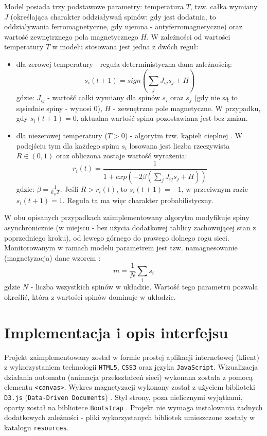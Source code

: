 \documentclass[11pt] {article}
\begin{document}
\vspace{1.0em}
Model posiada trzy podstawowe parametry: temperatura $T$, tzw. całka wymiany $J$ (określająca charakter oddziaływań spinów: gdy jest dodatnia, to oddziaływania ferromagnetyczne, gdy ujemna - antyferromagnetyczne) oraz wartość zewnętrznego pola magnetycznego $H$. W zależności od wartości temperatury $T$ w modelu stosowana jest jedna z dwóch reguł:
\begin{itemize}
\item dla zerowej temperatury - reguła deterministyczna \cite{malarz, kulakowski} dana zależnością: 
\begin{equation}
s_i(t + 1) = sign \left( \sum_jJ_{ij}s_j + H \right)
\end{equation}
gdzie: $J_{ij}$ - wartość całki wymiany dla spinów $s_i$ oraz $s_j$ (gdy nie są to sąsiednie spiny - wynosi 0), $H$ - zewnętrzne pole magnetyczne. W przypadku, gdy $s_i(t + 1) = 0$, aktualna wartość spinu pozostawiana jest bez zmian.

\item dla niezerowej temperatury ($T > 0$) - algorytm tzw. kąpieli cieplnej \cite{baldyga}. W podejściu tym dla każdego spinu $s_i$ losowana jest liczba rzeczywista $R \in (0, 1)$ oraz obliczona zostaje wartość wyrażenia:
\begin{equation}
r_i(t) = \frac{1}{1 + exp(-2\beta (\sum_{j} J_{ij}s_j + H))}
\end{equation}
gdzie: $\beta = \frac{1}{k_BT}$. Jeśli $R > r_i(t)$, to $s_i(t + 1) = -1$, w przeciwnym razie $s_i(t + 1) = 1$. Reguła ta ma więc charakter probabilistyczny.
\end{itemize}

W obu opisanych przypadkach zaimplementowany algorytm modyfikuje spiny asynchronicznie (w miejscu - bez użycia dodatkowej tablicy zachowującej stan z poprzedniego kroku), od lewego górnego do prawego dolnego rogu sieci. Monitorowanym w ramach modelu parametrem jest tzw. namagnesowanie (magnetyzacja) dane wzorem \cite{wiki}:
\begin{equation}
m = \frac{1}{N} \sum_{i} s_i
\end{equation}
gdzie $N$ - liczba wszystkich spinów w układzie. Wartość tego parametru pozwala określić, która z wartości spinów dominuje w układzie.


\section{Implementacja i opis interfejsu}
Projekt zaimplementowany został w formie prostej aplikacji internetowej (klient) z wykorzystaniem technologii \lstinline{HTML5}, \lstinline{CSS3} oraz języka \lstinline{JavaScript}. Wizualizacja działania automatu (animacja przekształceń sieci) wykonana została z pomocą elementu \lstinline{<canvas>}. Wykres magnetyzacji wykonany został z użyciem biblioteki \lstinline{D3.js} (\lstinline{Data-Driven Documents}) \cite{d3}. Styl strony, poza nielicznymi wyjątkami, oparty został na bibliotece \lstinline{Bootstrap} \cite{bootstrap}. Projekt nie wymaga instalowania żadnych dodatkowych zależności - pliki wykorzystanych bibliotek umieszczone zostały w katalogu \lstinline{resources}.
\end{document}
